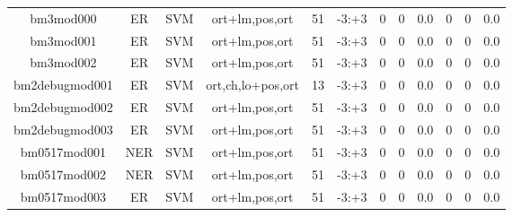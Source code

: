\documentclass[a4paper]{article}
\begin{document}
\begin{landscape}
\begin{center}
\begin{tabular}{ |c|c|c|c|c|c|c|c|c|c|c|c|}
 	

 
 	
 	\small{ bm3mod000 } & ER & SVM & ort+lm,pos,ort  &  51 &  -3:+3  &  0 & 0 & 0.0  &  0 & 0 & 0.0 \\
 	

 
 	
 	\small{ bm3mod001 } & ER & SVM & ort+lm,pos,ort  &  51 &  -3:+3  &  0 & 0 & 0.0  &  0 & 0 & 0.0 \\
 	

 
 	
 	\small{ bm3mod002 } & ER & SVM & ort+lm,pos,ort  &  51 &  -3:+3  &  0 & 0 & 0.0  &  0 & 0 & 0.0 \\
 	

 
 	
 	\small{ bm2debugmod001 } & ER & SVM & ort,ch,lo+pos,ort  &  13 &  -3:+3  &  0 & 0 & 0.0  &  0 & 0 & 0.0 \\
 	

 
 	
 	\small{ bm2debugmod002 } & ER & SVM & ort+lm,pos,ort  &  51 &  -3:+3  &  0 & 0 & 0.0  &  0 & 0 & 0.0 \\
 	

 
 	
 	\small{ bm2debugmod003 } & ER & SVM & ort+lm,pos,ort  &  51 &  -3:+3  &  0 & 0 & 0.0  &  0 & 0 & 0.0 \\
 	

 
 	
 	\small{ bm0517mod001 } & NER & SVM & ort+lm,pos,ort  &  51 &  -3:+3  &  0 & 0 & 0.0  &  0 & 0 & 0.0 \\
 	

 
 	
 	\small{ bm0517mod002 } & NER & SVM & ort+lm,pos,ort  &  51 &  -3:+3  &  0 & 0 & 0.0  &  0 & 0 & 0.0 \\
 	

 
 	
 	\small{ bm0517mod003 } & ER & SVM & ort+lm,pos,ort  &  51 &  -3:+3  &  0 & 0 & 0.0  &  0 & 0 & 0.0 \\
 	

 
 \hline
\end{tabular}
\end{center}

\end{landscape}
\end{document}

